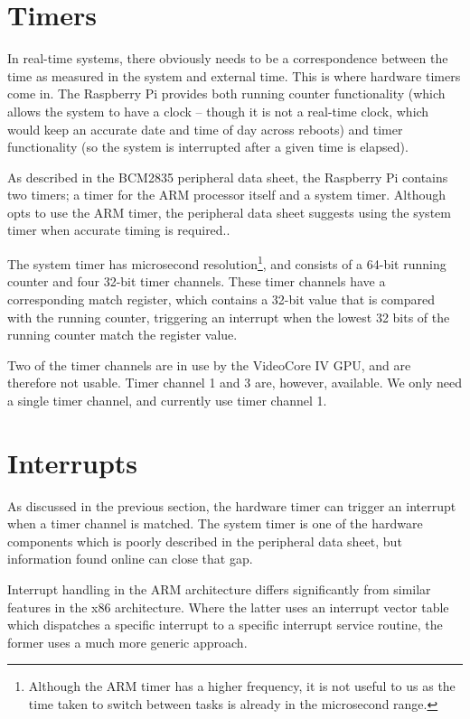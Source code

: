 \documentclass[twoside]{uva-inf-bachelor-thesis}
\begin{document}
\section{Timers}
In real-time systems, there obviously needs to be a correspondence between the time as measured in the system and external time. This is where hardware timers come in. The Raspberry Pi provides both running counter functionality (which allows the system to have a clock -- though it is not a real-time clock, which would keep an accurate date and time of day across reboots) and timer functionality (so the system is interrupted after a given time is elapsed).

As described in the BCM2835 peripheral data sheet, the Raspberry Pi contains two timers; a timer for the ARM processor itself and a system timer. Although \textcite{sfd:realpi} opts to use the ARM timer, the peripheral data sheet suggests using the system timer when accurate timing is required.\cite[p. 196]{bcm:2835peripherals}.

The system timer has microsecond resolution\footnote{Although the ARM timer has a higher frequency, it is not useful to us as the time taken to switch between tasks is already in the microsecond range.}, and consists of a 64-bit running counter and four 32-bit timer channels. These timer channels have a corresponding match register, which contains a 32-bit value that is compared with the running counter, triggering an interrupt when the lowest 32 bits of the running counter match the register value.

Two of the timer channels are in use by the VideoCore IV GPU, and are therefore not usable. Timer channel 1 and 3 are, however, available. We only need a single timer channel, and currently use timer channel 1.

\section{Interrupts}
As discussed in the previous section, the hardware timer can trigger an interrupt when a timer channel is matched. The system timer is one of the hardware components which is poorly described in the peripheral data sheet, but information found online can close that gap.

Interrupt handling in the ARM architecture differs significantly from similar features in the x86 architecture. Where the latter uses an interrupt vector table which dispatches a specific interrupt to a specific interrupt service routine, the former uses a much more generic approach.
\end{document}
